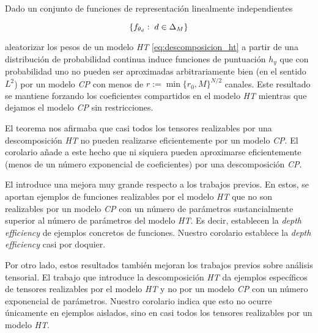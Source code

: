\begin{corolario} \label{corol:corol_principal}

    Dado un conjunto de funciones de representación linealmente independientes

    \begin{equation}
        \{ f_{\theta_d}: \; d \in \Delta_{M} \}
    \end{equation}

     aleatorizar los pesos de un modelo \textit{HT} \eqref{eq:descomposicion_ht} a partir de una distribución de probabilidad continua induce funciones de puntuación $h_y$ que con probabilidad uno no pueden ser aproximadas arbitrariamente bien (en el sentido $L^2$) por un modelo \textit{CP} con menos de $r := \min \{r_0, M \}^{N/2}$ canales. Este resultado se mantiene forzando los coeficientes compartidos en el modelo \textit{HT} mientras que dejamos el modelo \textit{CP} sin restricciones.

\end{corolario}

El teorema nos afirmaba que casi todos los tensores realizables por una descomposición \textit{HT} no pueden realizarse eficientemente por un modelo \textit{CP}. El corolario añade a este hecho que ni siquiera pueden aproximarse eficientemente (menos de un número exponencial de coeficientes) por una descomposición \textit{CP}.

El  introduce una mejora muy grande respecto a los trabajos previos. En estos, se aportan ejemplos de funciones realizables por el modelo \textit{HT} que no son realizables por un modelo \textit{CP} con un número de parámetros sustancialmente superior al número de parámetros del modelo \textit{HT}. Es decir, establecen la \textit{depth efficiency} de ejemplos concretos de funciones. Nuestro corolario establece la \textit{depth efficiency} casi por doquier.

Por otro lado, estos resultados también mejoran los trabajos previos sobre análisis tensorial. El trabajo que introduce la descomposición \textit{HT} \cite{matematicas:descomposicion_ht} da ejemplos específicos de tensores realizables por el modelo \textit{HT} y no por un modelo \textit{CP} con un número exponencial de parámetros. Nuestro corolario indica que esto no ocurre únicamente en ejemplos aislados, sino en casi todos los tensores realizables por un modelo \textit{HT}.

